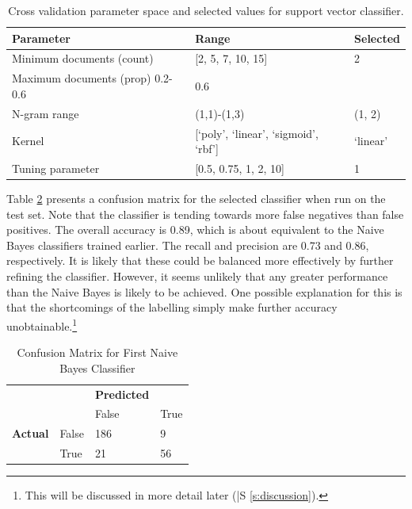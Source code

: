 \documentclass{article}
\begin{document}
\begin{table}[]
        \centering
        \footnotesize
        \begin{tabular}{l|ll}
          Parameter & Range & Selected \\
          \hline
          Minimum documents (count) & [2, 5, 7, 10, 15] & 2 \\ %
          Maximum documents (prop) 0.2-0.6 & 0.6 \\
          N-gram range & (1,1)-(1,3) & (1, 2) \\
          Kernel & [`poly', `linear', `sigmoid', `rbf'] & `linear' \\
          Tuning parameter & [0.5, 0.75, 1, 2, 10] & 1
        \end{tabular}
        \caption{Cross validation parameter space and selected values for support vector classifier.}
        \label{t:svm-cv}
\end{table}

Table \ref{t:svc-confusion} presents a confusion matrix for the selected classifier when run on the test set. Note that the classifier is tending towards more false negatives than false positives. The overall accuracy is 0.89, which is about equivalent to the Naive Bayes classifiers trained earlier. The recall and precision are 0.73 and 0.86, respectively. It is likely that these could be balanced more effectively by further refining the classifier. However, it seems unlikely that any greater performance than the Naive Bayes is likely to be achieved. One possible explanation for this is that the shortcomings of the labelling simply make further accuracy unobtainable.\footnote{This will be discussed in more detail later (|S \ref{s:discussion}).}


\begin{table}[]
        \centering
        \footnotesize
        \begin{tabular}{ll|ll}
        & & \textbf{Predicted} & \\
        & & False & True \\
        \hline
        \textbf{Actual} & False & 186 & 9 \\
        & True & 21 & 56 \\
        \end{tabular}
        \caption{Confusion Matrix for First Naive Bayes Classifier}
        \label{t:svc-confusion}
\end{table}
\end{document}
